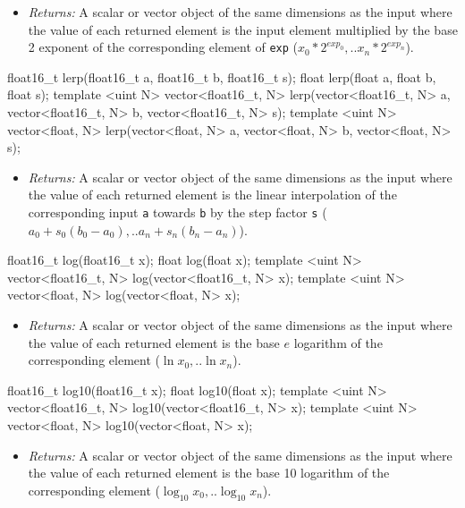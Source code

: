 \begin{itemize}
  \item \textit{Returns:} A scalar or vector object of the same dimensions as
  the input where the value of each returned element is the input element
  multiplied by the base 2 exponent of the corresponding element of \texttt{exp}
  (\(x_0 * 2^{exp_0}, .. x_n * 2^{exp_n}\)).
\end{itemize}

\begin{HLSL}
float16_t lerp(float16_t a, float16_t b, float16_t s);
float lerp(float a, float b, float s);
template <uint N>
vector<float16_t, N> lerp(vector<float16_t, N> a, vector<float16_t, N> b,
                          vector<float16_t, N> s);
template <uint N>
vector<float, N> lerp(vector<float, N> a, vector<float, N> b,
                      vector<float, N> s);
\end{HLSL}

\begin{itemize}
  \item \textit{Returns:} A scalar or vector object of the same dimensions as
  the input where the value of each returned element is the linear interpolation
  of the corresponding input \texttt{a} towards \texttt{b} by the step factor
  \texttt{s} (\(a_0 + s_0(b_0-a_0), .. a_n + s_n(b_n-a_n)\)).
\end{itemize}

\begin{HLSL}
float16_t log(float16_t x);
float log(float x);
template <uint N> vector<float16_t, N> log(vector<float16_t, N> x);
template <uint N> vector<float, N> log(vector<float, N> x);
\end{HLSL}

\begin{itemize}
  \item \textit{Returns:} A scalar or vector object of the same dimensions as
  the input where the value of each returned element is the base $e$ logarithm
  of the corresponding element (\(\ln x_0, .. \ln x_n\)).
\end{itemize}

\begin{HLSL}
float16_t log10(float16_t x);
float log10(float x);
template <uint N> vector<float16_t, N> log10(vector<float16_t, N> x);
template <uint N> vector<float, N> log10(vector<float, N> x);
\end{HLSL}

\begin{itemize}
  \item \textit{Returns:} A scalar or vector object of the same dimensions as
  the input where the value of each returned element is the base 10 logarithm
  of the corresponding element (\(\log_{10} x_0, .. \log_{10} x_n\)).
\end{itemize}

